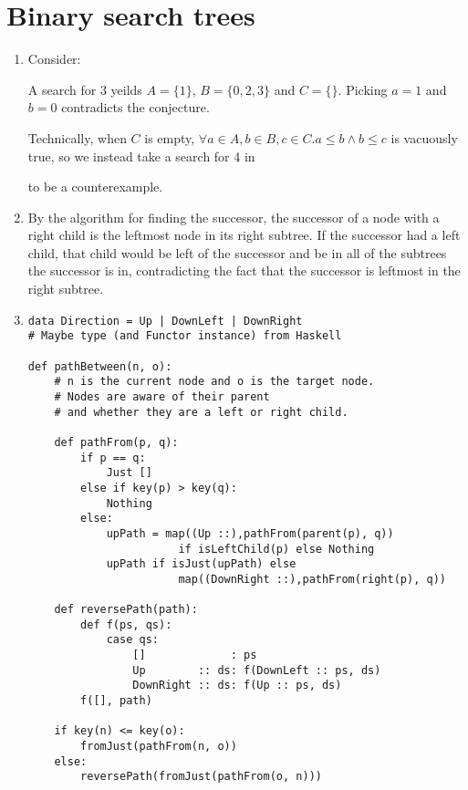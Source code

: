 \documentclass[11pt]{article}
\begin{document}
\section{Binary search trees}
\begin{enumerate}
\item Consider:


  A search for 3 yeilds \(A=\{1\}\), \(B=\{0,2,3\}\) and \(C=\{\}\). Picking \(a=1\) and \(b=0\) contradicts the conjecture.

  Technically, when \(C\) is empty, \(\forall a\in A,b\in B,c\in C.a\leq b\wedge b\leq c\) is vacuously true, so we instead take a search for 4 in


  to be a counterexample.
\item By the algorithm for finding the successor, the successor of a node with a right child is the leftmost node in its right subtree. If the successor had a left child, that child would be left of the successor and be in all of the subtrees the successor is in, contradicting the fact that the successor is leftmost in the right subtree.
\item
  \begin{minipage}[t]{\linewidth}
    \begin{lstlisting}
data Direction = Up | DownLeft | DownRight
# Maybe type (and Functor instance) from Haskell

def pathBetween(n, o):
    # n is the current node and o is the target node.
    # Nodes are aware of their parent
    # and whether they are a left or right child.

    def pathFrom(p, q):
        if p == q:
            Just []
        else if key(p) > key(q):
            Nothing
        else:
            upPath = map((Up ::),pathFrom(parent(p), q))
                       if isLeftChild(p) else Nothing
            upPath if isJust(upPath) else
                       map((DownRight ::),pathFrom(right(p), q))

    def reversePath(path):
        def f(ps, qs):
            case qs:
                []             : ps
                Up        :: ds: f(DownLeft :: ps, ds)
                DownRight :: ds: f(Up :: ps, ds)
        f([], path)

    if key(n) <= key(o):
        fromJust(pathFrom(n, o))
    else:
        reversePath(fromJust(pathFrom(o, n)))
    \end{lstlisting}
  \end{minipage}
\end{enumerate}
\end{document}
